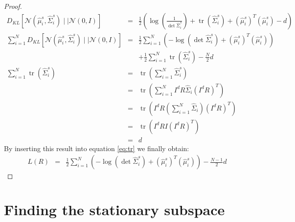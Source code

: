 \documentclass[a4paper, 12pt, titlepage]{article}
\DeclareMathOperator{\tr}{tr}
\begin{document}
\begin{proof}
	\begin{eqnarray}
		D_{KL}\left[\mathcal{N}(\hat{ \mu}_i^{s}, \hat{ \Sigma}_i^s )\mid \mid \mathcal{N}(0, I) \right] &=& \frac{1}{2} \left(\log\left( \frac{1}{\det \hat{ \Sigma}_i^s} \right) + \tr(\hat\Sigma_i^s) + (\hat\mu_i^s)^T(\hat\mu_i^s) - d \right)\\
		 \sum_{i=1}^N D_{KL}\left[\mathcal{N}(\hat{ \mu}_i^{s}, \hat{ \Sigma}_i^s )\mid \mid \mathcal{N}(0, I) \right] &=& \frac{1}{2}\sum_{i=1}^{N} \left( -\log \left( \det \hat \Sigma_i^s \right) + (\hat\mu_i^s)^T(\hat\mu_i^s) \right) \nonumber\\
		 &&+\frac{1}{2}\sum_{i=1}^N \tr(\hat \Sigma_i^s) - \frac{N}{2}d \label{eq:tr}\\
		 \sum_{i=1}^N \tr(\hat \Sigma_i^s) &=& \tr\left(\sum_{i=1}^N \hat\Sigma_i^s \right)\\
		 &=& \tr\left(\sum_{i=1}^N I^dR\hat\Sigma_i (I^dR)^T \right) \\
		 &=& \tr \left( I^dR \left( \sum_{i=1}^N \hat \Sigma_i \right) (I^dR)^T \right)\\
		 &=& \tr \left( I^dR I (I^dR)^T \right)\\
		 &=& d
	\end{eqnarray}
	By inserting this result into equation \eqref{eq:tr} we finally obtain:
	\begin{eqnarray}
		 L(R) &=& \frac{1}{2}\sum_{i=1}^{N} \left( -\log \left( \det \hat \Sigma_i^s \right) + (\hat\mu_i^s)^T(\hat\mu_i^s) \right) - \frac{N-1}{2}d
	\end{eqnarray}
\end{proof}



\section{Finding the stationary subspace}
\end{document}
